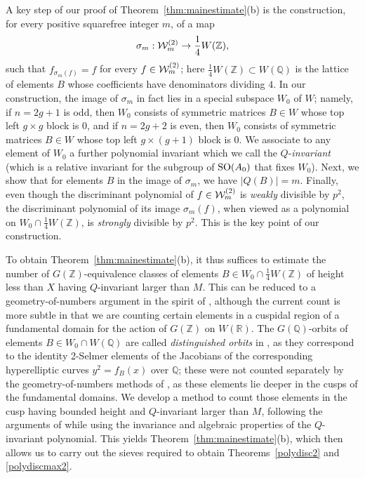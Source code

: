 \documentclass[11pt]{article}
\def\Z{{\mathbb Z}}
\def\SO{{\rm SO}}
\def\R{{\mathbb R}}
\def\Q{{\mathbb Q}}
\def\U{{\mathcal W}}
\def\Z{{\mathbb Z}}
\def\Q{{\mathbb Q}}
\def\w{{\rm {(2)}}}
\begin{document}
A key step of our proof of Theorem~\ref{thm:mainestimate}(b) is the
construction, for every positive squarefree integer $m$, of a map
\begin{equation*}
\sigma_m:\U_m^\w\to \frac14W(\Z),
\end{equation*}
such that $f_{\sigma_m(f)}=f$ for every $f\in \U_m^\w$; here
$\frac14W(\Z)\subset W(\Q)$ is the lattice of elements $B$ whose
coefficients have denominators dividing $4$.  In our construction, the
image of $\sigma_m$ in fact lies in a special subspace $W_0$ of $W$;
namely, if $n=2g+1$ is odd, then $W_0$ consists of symmetric matrices
$B\in W$ whose top left $g\times g$ block is 0, and if $n=2g+2$ is
even, then $W_0$ consists of symmetric matrices $B\in W$ whose top
left $g\times (g+1)$ block is 0. We associate to any element of $W_0$
a further polynomial invariant which we call the $Q$-{\it invariant}
(which is a relative invariant for the subgroup of $\SO(A_0)$ that
fixes $W_0$).
Next, we show that for elements $B$ in the image of $\sigma_m$, we
have $|Q(B)|=m$.
Finally, {even though the discriminant polynomial of $f\in\U_m^\w$ is
  {\it weakly} divisible by $p^2$, the discriminant polynomial of its
  image $\sigma_m(f)$, when viewed as a polynomial on $W_0\cap
  \frac14W(\Z)$, is {\it strongly} divisible by $p^2$.}  This is the
key point of our construction.

To obtain Theorem~\ref{thm:mainestimate}(b), it thus suffices to
estimate the number of $G(\Z)$-equivalence classes of elements $B\in
W_0\cap \frac14W(\Z)$ of height less than $X$ having $Q$-invariant
larger than $M$.  This can be reduced to a geometry-of-numbers
argument in the spirit of \cite{BG2,SW}, although the current count is
more subtle in that we are counting certain elements in a cuspidal
region of a fundamental domain for the action of $G(\Z)$ on $W(\R)$.
The $G(\Q)$-orbits of elements $B\in W_0\cap W(\Q)$ are called {\it
  distinguished orbits} in \cite{BG2,SW}, as they correspond to the
identity 2-Selmer elements of the Jacobians of the corresponding
hyperelliptic curves $y^2=f_B(x)$ over $\Q$; these were not counted
separately by the geometry-of-numbers methods of \cite{BG2,SW}, as
these elements lie deeper in the cusps of the fundamental domains.  We
develop a method to count those elements in the cusp having bounded height and $Q$-invariant larger than $M$, following
the arguments of \cite{BG2,SW} while using the invariance and
algebraic properties of the $Q$-invariant polynomial.  This yields
Theorem~\ref{thm:mainestimate}(b), which then allows us to carry out
the sieves required to obtain Theorems~\ref{polydisc2} and
\ref{polydiscmax2}.
\end{document}
